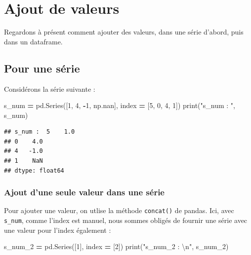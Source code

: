 \documentclass[
  12pt,
]{book}
\newenvironment{Shaded}{\begin{snugshade}}{\end{snugshade}}
\newcommand{\BuiltInTok}[1]{#1}
\newcommand{\CharTok}[1]{\textcolor[rgb]{0.31,0.60,0.02}{#1}}
\newcommand{\DecValTok}[1]{\textcolor[rgb]{0.00,0.00,0.81}{#1}}
\newcommand{\NormalTok}[1]{#1}
\newcommand{\OperatorTok}[1]{\textcolor[rgb]{0.81,0.36,0.00}{\textbf{#1}}}
\newcommand{\StringTok}[1]{\textcolor[rgb]{0.31,0.60,0.02}{#1}}
\numberwithin{equation}{section}
\numberwithin{countremarque}{section}
\begin{document}
\section{Ajout de valeurs}\label{pandas-ajout-valeurs}

Regardons à présent comment ajouter des valeurs, dans une série d'abord, puis dans un dataframe.

\subsection{Pour une série}\label{pour-une-suxe9rie-1}

Considérons la série suivante :

\begin{Shaded}
\begin{Highlighting}[]
\NormalTok{s\_num }\OperatorTok{=}\NormalTok{ pd.Series([}\DecValTok{1}\NormalTok{, }\DecValTok{4}\NormalTok{, }\OperatorTok{{-}}\DecValTok{1}\NormalTok{, np.nan],}
\NormalTok{             index }\OperatorTok{=}\NormalTok{ [}\DecValTok{5}\NormalTok{, }\DecValTok{0}\NormalTok{, }\DecValTok{4}\NormalTok{, }\DecValTok{1}\NormalTok{])}
\BuiltInTok{print}\NormalTok{(}\StringTok{"s\_num : "}\NormalTok{, s\_num)}
\end{Highlighting}
\end{Shaded}

\begin{lstlisting}
## s_num :  5    1.0
## 0    4.0
## 4   -1.0
## 1    NaN
## dtype: float64
\end{lstlisting}

\subsubsection{Ajout d'une seule valeur dans une série}\label{ajout-dune-seule-valeur-dans-une-suxe9rie}

Pour ajouter une valeur, on utlise la méthode \texttt{concat()} de pandas. Ici, avec \texttt{s\_num}, comme l'index est manuel, nous sommes obligés de fournir une série avec une valeur pour l'index également :

\begin{Shaded}
\begin{Highlighting}[]
\NormalTok{s\_num\_2 }\OperatorTok{=}\NormalTok{ pd.Series([}\DecValTok{1}\NormalTok{], index }\OperatorTok{=}\NormalTok{ [}\DecValTok{2}\NormalTok{])}
\BuiltInTok{print}\NormalTok{(}\StringTok{"s\_num\_2 : }\CharTok{\textbackslash{}n}\StringTok{"}\NormalTok{, s\_num\_2)}
\end{Highlighting}
\end{Shaded}
\end{document}
